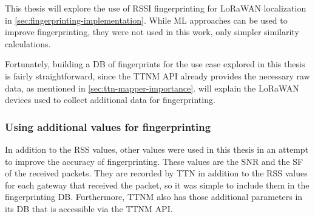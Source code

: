 This thesis will explore the use of \ac{RSSI} fingerprinting for \ac{LoRaWAN} localization in \cref{sec:fingerprinting-implementation}.
While \ac{ML} approaches can be used to improve fingerprinting, they were not used in this work, only simpler similarity calculations.

Fortunately, building a \ac{DB} of fingerprints for the use case explored in this thesis is fairly straightforward, since the \ac{TTNM} \ac{API} already provides the necessary raw data, as mentioned in \cref{sec:ttn-mapper-importance}.
 will explain the \ac{LoRaWAN} devices used to collect additional data for fingerprinting.

\subsubsection{Using additional values for fingerprinting}\label{sec:fingerprinting-additional-values}

In addition to the \ac{RSS} values, other values were used in this thesis in an attempt to improve the accuracy of fingerprinting.
These values are the \ac{SNR} and the \ac{SF} of the received packets.
They are recorded by \ac{TTN} in addition to the \ac{RSS} values for each gateway that received the packet, so it was simple to include them in the fingerprinting \ac{DB}.
Furthermore, \ac{TTNM} also has those additional parameters in its \ac{DB} that is accessible via the \ac{TTNM} \ac{API}.